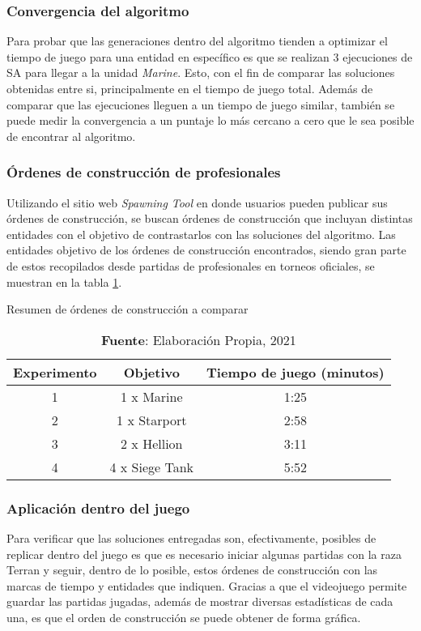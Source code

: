 \subsubsection{Convergencia del algoritmo}

Para probar que las generaciones dentro del algoritmo tienden a optimizar el tiempo de juego para una entidad en específico es que se realizan 3 ejecuciones de SA para llegar a la unidad \textit{Marine}. Esto, con el fin de comparar las soluciones obtenidas entre si, principalmente en el tiempo de juego total. Además de comparar que las ejecuciones lleguen a un tiempo de juego similar, también se puede medir la convergencia a un puntaje lo más cercano a cero que le sea posible de encontrar al algoritmo.

\subsubsection{Órdenes de construcción de profesionales}

Utilizando el sitio web \textit{Spawning Tool} en donde usuarios pueden publicar sus órdenes de construcción, se buscan órdenes de construcción que incluyan distintas entidades con el objetivo de contrastarlos con las soluciones del algoritmo. Las entidades objetivo de los órdenes de construcción encontrados, siendo gran parte de estos recopilados desde partidas de profesionales en torneos oficiales, se muestran en la tabla \ref{tab:expbo}.

\begin{table}[H]
\centering
\def\arraystretch{1.8}
\captionsetup{justification=centering}
\caption{Resumen de órdenes de construcción a comparar}
\label{tab:expbo}
\begin{tabular}{|c|c|c|}
\hline
\textbf{Experimento} & \textbf{Objetivo} & \textbf{Tiempo de juego (minutos)} \\
\hline
1 & 1 x Marine & 1:25 \\ \hline
2 & 1 x Starport & 2:58 \\ \hline
3 & 2 x Hellion & 3:11 \\ \hline
4 & 4 x Siege Tank & 5:52\\ \hline
\end{tabular}
\caption*{\textbf{Fuente}: Elaboración Propia, 2021}
\end{table}

\subsubsection{Aplicación dentro del juego}

Para verificar que las soluciones entregadas son, efectivamente, posibles de replicar dentro del juego es que es necesario iniciar algunas partidas con la raza Terran y seguir, dentro de lo posible, estos órdenes de construcción con las marcas de tiempo y entidades que indiquen. Gracias a que el videojuego permite guardar las partidas jugadas, además de mostrar diversas estadísticas de cada una, es que el orden de construcción se puede obtener de forma gráfica.